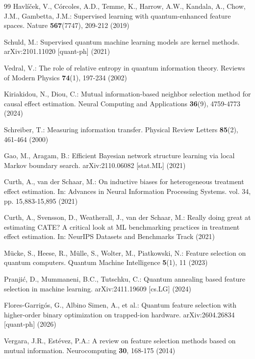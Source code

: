 \documentclass{svproc}
\begin{document}
\begin{thebibliography}{99}
Havl\'{i}\v{c}ek, V., C\'{o}rcoles, A.D., Temme, K., Harrow, A.W., Kandala, A., Chow, J.M., Gambetta, J.M.: Supervised learning with quantum-enhanced feature spaces. Nature \textbf{567}(7747), 209-212 (2019)

Schuld, M.: Supervised quantum machine learning models are kernel methods. arXiv:2101.11020 [quant-ph] (2021)

Vedral, V.: The role of relative entropy in quantum information theory. Reviews of Modern Physics \textbf{74}(1), 197-234 (2002)

Kiriakidou, N., Diou, C.: Mutual information-based neighbor selection method for causal effect estimation. Neural Computing and Applications \textbf{36}(9), 4759-4773 (2024)

Schreiber, T.: Measuring information transfer. Physical Review Letters \textbf{85}(2), 461-464 (2000)

Gao, M., Aragam, B.: Efficient Bayesian network structure learning via local Markov boundary search. arXiv:2110.06082 [stat.ML] (2021)

Curth, A., van der Schaar, M.: On inductive biases for heterogeneous treatment effect estimation. In: Advances in Neural Information Processing Systems. vol. 34, pp. 15,883-15,895 (2021)

Curth, A., Svensson, D., Weatherall, J., van der Schaar, M.: Really doing great at estimating CATE? A critical look at ML benchmarking practices in treatment effect estimation. In: NeurIPS Datasets and Benchmarks Track (2021)

M\"{u}cke, S., Heese, R., M\"{u}lle, S., Wolter, M., Piatkowski, N.: Feature selection on quantum computers. Quantum Machine Intelligence \textbf{5}(1), 11 (2023)

Pranji\'{c}, D., Mummaneni, B.C., Tutschku, C.: Quantum annealing based feature selection in machine learning. arXiv:2411.19609 [cs.LG] (2024)

Flores-Garrig\'{o}s, G., Albino Simen, A., et al.: Quantum feature selection with higher-order binary optimization on trapped-ion hardware. arXiv:2604.26834 [quant-ph] (2026)

Vergara, J.R., Est\'{e}vez, P.A.: A review on feature selection methods based on mutual information. Neurocomputing \textbf{30}, 168-175 (2014)


\end{thebibliography}
\end{document}
